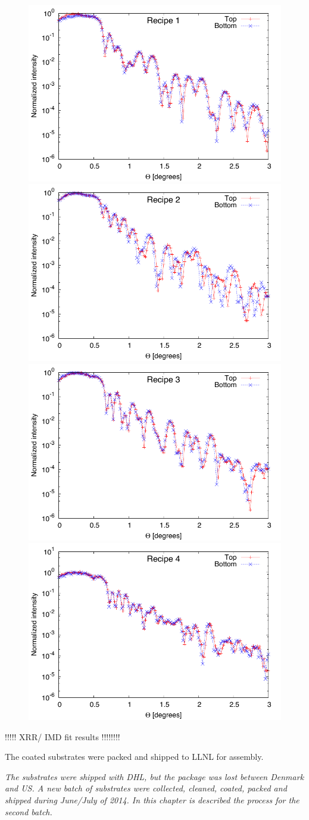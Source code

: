 \begin{figure}[htbp]
  \centering  \includegraphics[width=0.45\linewidth]{figures/cast/cast_recipe1.pdf}  \includegraphics[width=0.45\linewidth]{figures/cast/cast_recipe2.pdf}\\  \includegraphics[width=0.45\linewidth]{figures/cast/cast_recipe3.pdf}  \includegraphics[width=0.45\linewidth]{figures/cast/cast_recipe4.pdf}
  \caption{\footnotesize }
  \label{fig:cast_recipe_xrr}
\end{figure}

!!!!! XRR/ IMD fit results !!!!!!!!

The coated substrates were packed and shipped to LLNL for assembly.

\emph{The substrates were shipped with DHL, but the package was lost between Denmark and US. A new batch of substrates were collected, cleaned, coated, packed and shipped during June/July of 2014. In this chapter is described the process for the second batch.}

